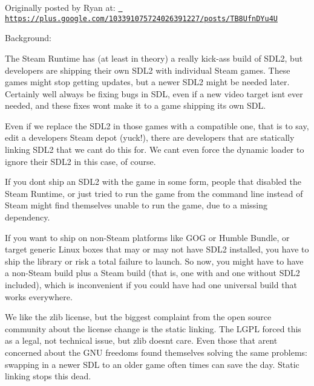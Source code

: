 Originally posted by Ryan at\+: \href{https://plus.google.com/103391075724026391227/posts/TB8UfnDYu4U}{\texttt{ https\+://plus.\+google.\+com/103391075724026391227/posts/\+T\+B8\+Ufn\+D\+Yu4U}}

Background\+:


\begin{DoxyItemize}
\item The Steam Runtime has (at least in theory) a really kick-\/ass build of S\+D\+L2, but developers are shipping their own S\+D\+L2 with individual Steam games. These games might stop getting updates, but a newer S\+D\+L2 might be needed later. Certainly we\textquotesingle{}ll always be fixing bugs in S\+DL, even if a new video target isn\textquotesingle{}t ever needed, and these fixes won\textquotesingle{}t make it to a game shipping its own S\+DL.
\item Even if we replace the S\+D\+L2 in those games with a compatible one, that is to say, edit a developer\textquotesingle{}s Steam depot (yuck!), there are developers that are statically linking S\+D\+L2 that we can\textquotesingle{}t do this for. We can\textquotesingle{}t even force the dynamic loader to ignore their S\+D\+L2 in this case, of course.
\item If you don\textquotesingle{}t ship an S\+D\+L2 with the game in some form, people that disabled the Steam Runtime, or just tried to run the game from the command line instead of Steam might find themselves unable to run the game, due to a missing dependency.
\item If you want to ship on non-\/\+Steam platforms like G\+OG or Humble Bundle, or target generic Linux boxes that may or may not have S\+D\+L2 installed, you have to ship the library or risk a total failure to launch. So now, you might have to have a non-\/\+Steam build plus a Steam build (that is, one with and one without S\+D\+L2 included), which is inconvenient if you could have had one universal build that works everywhere.
\item We like the zlib license, but the biggest complaint from the open source community about the license change is the static linking. The L\+G\+PL forced this as a legal, not technical issue, but zlib doesn\textquotesingle{}t care. Even those that aren\textquotesingle{}t concerned about the G\+NU freedoms found themselves solving the same problems\+: swapping in a newer S\+DL to an older game often times can save the day. Static linking stops this dead.
\end{DoxyItemize}

